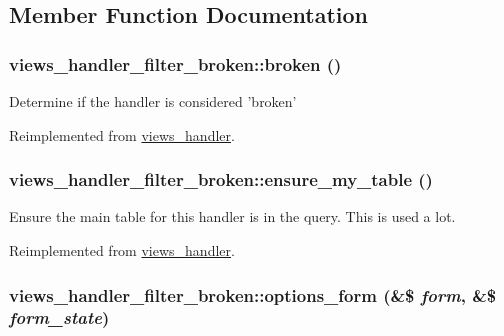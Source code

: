\subsection{Member Function Documentation}
\hypertarget{classviews__handler__filter__broken_912a78cd8ee1d5c139613d252f2ca9e1}{
\subsubsection[{broken}]{\setlength{\rightskip}{0pt plus 5cm}views\_\-handler\_\-filter\_\-broken::broken ()}}
\label{classviews__handler__filter__broken_912a78cd8ee1d5c139613d252f2ca9e1}


Determine if the handler is considered 'broken' 

Reimplemented from \hyperlink{classviews__handler_c1cd2ff30cb558c79cc908be516fb725}{views\_\-handler}.\hypertarget{classviews__handler__filter__broken_e85934ec4cf9e01aba2b17ce58ead155}{
\subsubsection[{ensure\_\-my\_\-table}]{\setlength{\rightskip}{0pt plus 5cm}views\_\-handler\_\-filter\_\-broken::ensure\_\-my\_\-table ()}}
\label{classviews__handler__filter__broken_e85934ec4cf9e01aba2b17ce58ead155}


Ensure the main table for this handler is in the query. This is used a lot. 

Reimplemented from \hyperlink{classviews__handler_947f21ef0f21a77f4d103af4702b3600}{views\_\-handler}.\hypertarget{classviews__handler__filter__broken_51fc714b7aec668a035da8dfb4b4a69a}{
\subsubsection[{options\_\-form}]{\setlength{\rightskip}{0pt plus 5cm}views\_\-handler\_\-filter\_\-broken::options\_\-form (\&\$ {\em form}, \/  \&\$ {\em form\_\-state})}}
\label{classviews__handler__filter__broken_51fc714b7aec668a035da8dfb4b4a69a}


